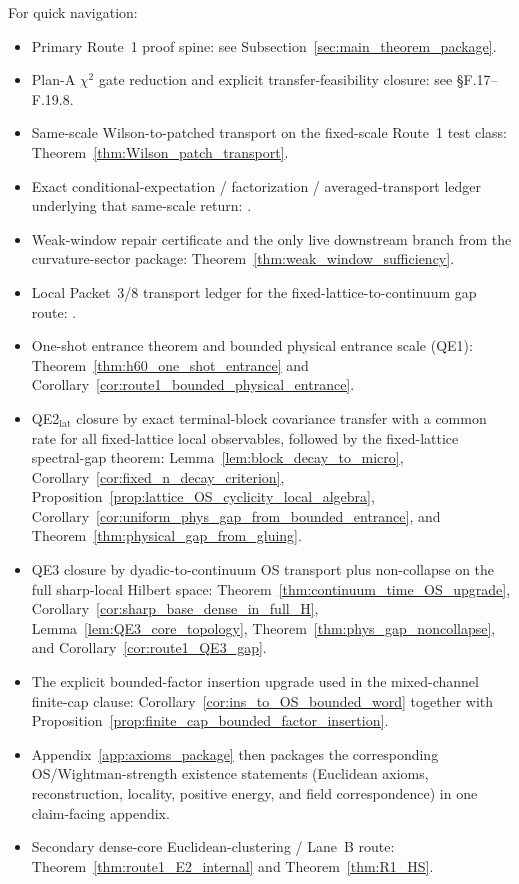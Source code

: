 For quick navigation:\begin{itemize}
\item Primary Route~1 proof spine: see Subsection~\ref{sec:main_theorem_package}.
\item Plan-A $\chi^2$ gate reduction and explicit transfer-feasibility closure: see \S F.17--F.19.8.
\item Same-scale Wilson-to-patched transport on the fixed-scale Route~1 test class: Theorem~\ref{thm:Wilson_patch_transport}.
\item Exact conditional-expectation / factorization / averaged-transport ledger underlying that same-scale return: .
\item Weak-window repair certificate and the only live downstream branch from the curvature-sector package: Theorem~\ref{thm:weak_window_sufficiency}.
\item Local Packet~3/8 transport ledger for the fixed-lattice-to-continuum gap route: .
\item One-shot entrance theorem and bounded physical entrance scale (QE1): Theorem~\ref{thm:h60_one_shot_entrance} and Corollary~\ref{cor:route1_bounded_physical_entrance}.
\item QE2$_{\mathrm{lat}}$ closure by exact terminal-block covariance transfer with a common rate for all fixed-lattice local observables, followed by the fixed-lattice spectral-gap theorem: Lemma~\ref{lem:block_decay_to_micro}, Corollary~\ref{cor:fixed_n_decay_criterion}, Proposition~\ref{prop:lattice_OS_cyclicity_local_algebra}, Corollary~\ref{cor:uniform_phys_gap_from_bounded_entrance}, and Theorem~\ref{thm:physical_gap_from_gluing}.
\item QE3 closure by dyadic-to-continuum OS transport plus non-collapse on the full sharp-local Hilbert space: Theorem~\ref{thm:continuum_time_OS_upgrade}, Corollary~\ref{cor:sharp_base_dense_in_full_H}, Lemma~\ref{lem:QE3_core_topology}, Theorem~\ref{thm:phys_gap_noncollapse}, and Corollary~\ref{cor:route1_QE3_gap}.
\item The explicit bounded-factor insertion upgrade used in the mixed-channel finite-cap clause: Corollary~\ref{cor:ins_to_OS_bounded_word} together with Proposition~\ref{prop:finite_cap_bounded_factor_insertion}.
\item Appendix~\ref{app:axioms_package} then packages the corresponding OS/Wightman-strength existence statements (Euclidean axioms, reconstruction, locality, positive energy, and field correspondence) in one claim-facing appendix.
\item Secondary dense-core Euclidean-clustering / Lane~B route: Theorem~\ref{thm:route1_E2_internal} and Theorem~\ref{thm:R1_HS}.
\end{itemize}

